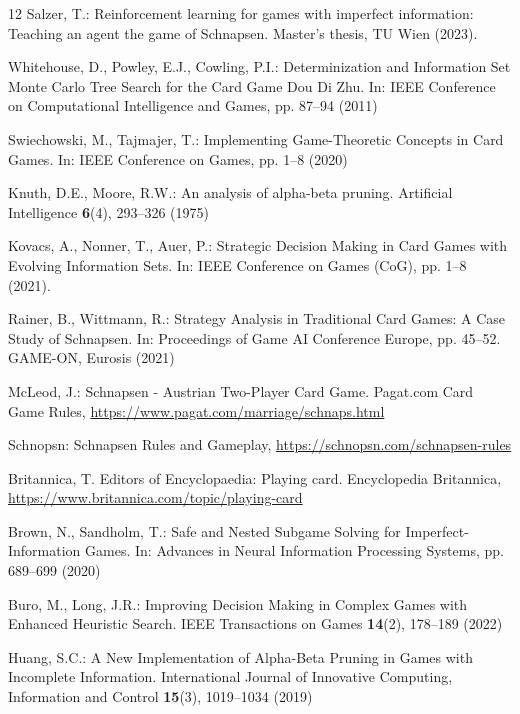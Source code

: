 \documentclass[runningheads]{llncs}
\begin{document}
\begin{thebibliography}{12}
Salzer, T.: Reinforcement learning for games with imperfect information: Teaching an agent the game of Schnapsen. Master's thesis, TU Wien (2023). 

Whitehouse, D., Powley, E.J., Cowling, P.I.: Determinization and Information Set Monte Carlo Tree Search for the Card Game Dou Di Zhu. In: IEEE Conference on Computational Intelligence and Games, pp. 87--94 (2011)

Swiechowski, M., Tajmajer, T.: Implementing Game-Theoretic Concepts in Card Games. In: IEEE Conference on Games, pp. 1--8 (2020)

Knuth, D.E., Moore, R.W.: An analysis of alpha-beta pruning. Artificial Intelligence \textbf{6}(4), 293--326 (1975)

Kovacs, A., Nonner, T., Auer, P.: Strategic Decision Making in Card Games with Evolving Information Sets. In: IEEE Conference on Games (CoG), pp. 1--8 (2021). 

Rainer, B., Wittmann, R.: Strategy Analysis in Traditional Card Games: A Case Study of Schnapsen. In: Proceedings of Game AI Conference Europe, pp. 45--52. GAME-ON, Eurosis (2021)

McLeod, J.: Schnapsen - Austrian Two-Player Card Game. Pagat.com Card Game Rules, \url{https://www.pagat.com/marriage/schnaps.html}

Schnopsn: Schnapsen Rules and Gameplay, \url{https://schnopsn.com/schnapsen-rules}

Britannica, T. Editors of Encyclopaedia: Playing card. Encyclopedia Britannica, \url{https://www.britannica.com/topic/playing-card}

Brown, N., Sandholm, T.: Safe and Nested Subgame Solving for Imperfect-Information Games. In: Advances in Neural Information Processing Systems, pp. 689--699 (2020)

Buro, M., Long, J.R.: Improving Decision Making in Complex Games with Enhanced Heuristic Search. IEEE Transactions on Games \textbf{14}(2), 178--189 (2022)

Huang, S.C.: A New Implementation of Alpha-Beta Pruning in Games with Incomplete Information. International Journal of Innovative Computing, Information and Control \textbf{15}(3), 1019--1034 (2019)


\end{thebibliography}
\end{document}
